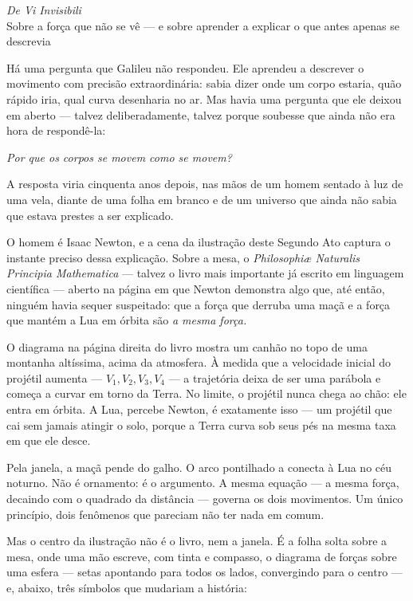 \begin{center}
    \textit{De Vi Invisibili} \\[0.2cm]
    {\small Sobre a força que não se vê --- e sobre aprender a explicar
    o que antes apenas se descrevia}
\end{center}

\bigskip

Há uma pergunta que Galileu não respondeu. Ele aprendeu a descrever o movimento com precisão extraordinária:
sabia dizer onde um corpo estaria, quão rápido iria, qual curva
desenharia no ar. Mas havia uma pergunta que ele deixou em aberto ---
talvez deliberadamente, talvez porque soubesse que ainda não era hora
de respondê-la:

\begin{center}
    \textit{Por que os corpos se movem como se movem?}
\end{center}

A resposta viria cinquenta anos depois, nas mãos de um homem sentado
à luz de uma vela, diante de uma folha em branco e de um universo
que ainda não sabia que estava prestes a ser explicado.

O homem é Isaac Newton, e a cena da ilustração deste Segundo Ato
captura o instante preciso dessa explicação. Sobre a mesa, o
\textit{Philosophiæ Naturalis Principia Mathematica} --- talvez o
livro mais importante já escrito em linguagem científica --- aberto
na página em que Newton demonstra algo que, até então, ninguém havia
sequer suspeitado: que a força que derruba uma maçã e a força que
mantém a Lua em órbita são \textit{a mesma força.}

O diagrama na página direita do livro mostra um canhão no topo de
uma montanha altíssima, acima da atmosfera. À medida que a
velocidade inicial do projétil aumenta --- $V_1, V_2, V_3, V_4$ ---
a trajetória deixa de ser uma parábola e começa a curvar em torno da
Terra. No limite, o projétil nunca chega ao chão: ele entra em órbita. A Lua,
percebe Newton, é exatamente isso --- um projétil que cai sem jamais
atingir o solo, porque a Terra curva sob seus pés na mesma taxa em
que ele desce.

Pela janela, a maçã pende do galho. O arco pontilhado a conecta à
Lua no céu noturno. Não é ornamento: é o argumento. A mesma
equação --- a mesma força, decaindo com o quadrado da distância ---
governa os dois movimentos. Um único princípio, dois fenômenos que
pareciam não ter nada em comum.

Mas o centro da ilustração não é o livro, nem a janela. É a folha
solta sobre a mesa, onde uma mão escreve, com tinta e compasso, o
diagrama de forças sobre uma esfera --- setas apontando para todos
os lados, convergindo para o centro --- e, abaixo, três símbolos que
mudariam a história:

